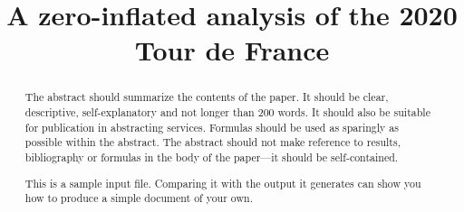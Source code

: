 \documentclass[aos,preprint]{imsart}
\begin{document}
\begin{frontmatter}
\title{A zero-inflated analysis of the 2020 Tour de France}

\begin{aug}
\author[A]{ }
\address[A]{Department of Statistics,
University of British Columbia.
}
\end{aug}

\begin{abstract}
The abstract should summarize the contents of the paper.
It should be clear, descriptive, self-explanatory and not longer
than 200 words. It should also be suitable for publication in
abstracting services. Formulas should be used as sparingly as
possible within the abstract. The abstract should not make
reference to results, bibliography or formulas in the body
of the paper---it should be self-contained.

This is a sample input file.  Comparing it with the output it
generates can show you how to produce a simple document of
your own.
\end{abstract}



\end{frontmatter}

%

%

%



%

\cite{Aldous:2010}

\small


\end{document}
